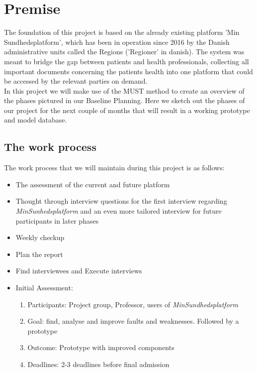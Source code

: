 \documentclass[a4paper,11pt]{article}
\begin{document}

\section{Premise}

The foundation of this project is based on the already existing platform 'Min Sundhedsplatform', which has been in operation since 2016 by the Danish administrative units called the Regions ('Regioner' in danish). The system was meant to bridge the gap between patients and health professionals, collecting all important documents concerning the patients health into one platform that could be accessed by the relevant parties on demand. \\

In this project we will make use of the MUST method to create an overview of the phases pictured in our Baseline Planning. Here we sketch out the phases of our project for the next couple of months that will result in a working prototype and model database.\\

\subsection{The work process}

The work process that we will maintain during this project is as follows:
\begin{itemize}
    \item The assessment of the current and future platform
    \item Thought through interview questions for the first interview regarding \textit{MinSunhedsplatform} and an even more tailored interview for future participants in later phases
    \item Weekly checkup
    \item Plan the report
    \item Find interviewees and Execute interviews
    \item Initial Assessment:
    \begin{enumerate}
        \item Participants: Project group, Professor, users of \textit{MinSundhedsplatform}
        \item Goal: find, analyse and improve faults and weaknesses. Followed by a prototype
        \item Outcome: Prototype with improved components
        \item Deadlines: 2-3 deadlines before final admission
    \end{enumerate}
\end{itemize}
\end{document}
